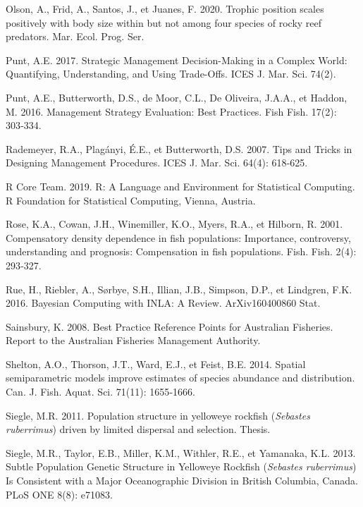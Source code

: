 \documentclass[french,11pt]{book}
\begin{document}
\leavevmode\hypertarget{ref-olson2020}{}%
Olson, A., Frid, A., Santos, J., et Juanes, F. 2020. Trophic position scales positively with body size within but not among four species of rocky reef predators. Mar. Ecol. Prog. Ser.

\leavevmode\hypertarget{ref-punt2017}{}%
Punt, A.E. 2017. Strategic Management Decision-Making in a Complex World: Quantifying, Understanding, and Using Trade-Offs. ICES J. Mar. Sci. 74(2).

\leavevmode\hypertarget{ref-punt2016}{}%
Punt, A.E., Butterworth, D.S., de Moor, C.L., De Oliveira, J.A.A., et Haddon, M. 2016. Management Strategy Evaluation: Best Practices. Fish Fish. 17(2): 303‑334.

\leavevmode\hypertarget{ref-rademeyer2007}{}%
Rademeyer, R.A., Plagányi, É.E., et Butterworth, D.S. 2007. Tips and Tricks in Designing Management Procedures. ICES J. Mar. Sci. 64(4): 618‑625.

\leavevmode\hypertarget{ref-r2019}{}%
R Core Team. 2019. R: A Language and Environment for Statistical Computing. R Foundation for Statistical Computing, Vienna, Austria.

\leavevmode\hypertarget{ref-rose2001}{}%
Rose, K.A., Cowan, J.H., Winemiller, K.O., Myers, R.A., et Hilborn, R. 2001. Compensatory density dependence in fish populations: Importance, controversy, understanding and prognosis: Compensation in fish populations. Fish. Fish. 2(4): 293‑327.

\leavevmode\hypertarget{ref-rue2016}{}%
Rue, H., Riebler, A., Sørbye, S.H., Illian, J.B., Simpson, D.P., et Lindgren, F.K. 2016. Bayesian Computing with INLA: A Review. ArXiv160400860 Stat.

\leavevmode\hypertarget{ref-sainsbury2008}{}%
Sainsbury, K. 2008. Best Practice Reference Points for Australian Fisheries. Report to the Australian Fisheries Management Authority.

\leavevmode\hypertarget{ref-shelton2014}{}%
Shelton, A.O., Thorson, J.T., Ward, E.J., et Feist, B.E. 2014. Spatial semiparametric models improve estimates of species abundance and distribution. Can. J. Fish. Aquat. Sci. 71(11): 1655‑1666.

\leavevmode\hypertarget{ref-siegle2011}{}%
Siegle, M.R. 2011. Population structure in yelloweye rockfish (\emph{Sebastes ruberrimus}) driven by limited dispersal and selection. Thesis.

\leavevmode\hypertarget{ref-siegle2013}{}%
Siegle, M.R., Taylor, E.B., Miller, K.M., Withler, R.E., et Yamanaka, K.L. 2013. Subtle Population Genetic Structure in Yelloweye Rockfish (\emph{Sebastes ruberrimus}) Is Consistent with a Major Oceanographic Division in British Columbia, Canada. PLoS ONE 8(8): e71083.
\end{document}
